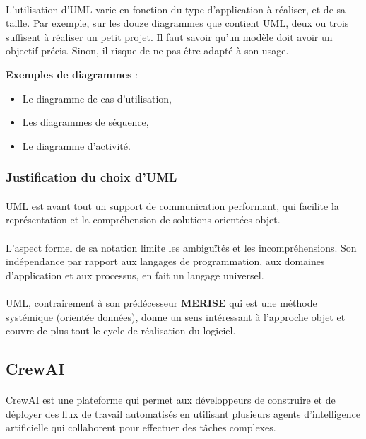 \paragraph{}
L’utilisation d’UML varie en fonction du type d’application à réaliser, et de sa taille. Par exemple, sur les douze diagrammes que contient UML, deux ou trois suffisent à réaliser un petit projet. Il faut savoir qu’un modèle doit avoir un objectif précis. Sinon, il risque de ne pas être adapté à son usage.

\textbf{Exemples de diagrammes} :
\begin{itemize}
    \item Le diagramme de cas d’utilisation,
    \item Les diagrammes de séquence,
    \item Le diagramme d'activité.
\end{itemize}
\subsubsection*{Justification du choix d’UML}
\paragraph{}
UML est avant tout un support de communication performant, qui facilite la représentation et la compréhension de solutions orientées objet.
\paragraph{}
L'aspect formel de sa notation limite les ambiguïtés et les incompréhensions. Son indépendance par rapport aux langages de programmation, aux domaines d'application et aux processus, en fait un langage universel.
\paragraph{}
UML, contrairement à son prédécesseur \textbf{MERISE} qui est une méthode systémique (orientée données), donne un sens intéressant à l'approche objet et couvre de plus tout le cycle de réalisation du logiciel.

\subsection{CrewAI }
\paragraph{}
CrewAI est une plateforme qui permet aux développeurs de construire et de déployer des flux de travail automatisés en utilisant plusieurs agents d'intelligence artificielle qui collaborent pour effectuer des tâches complexes.

